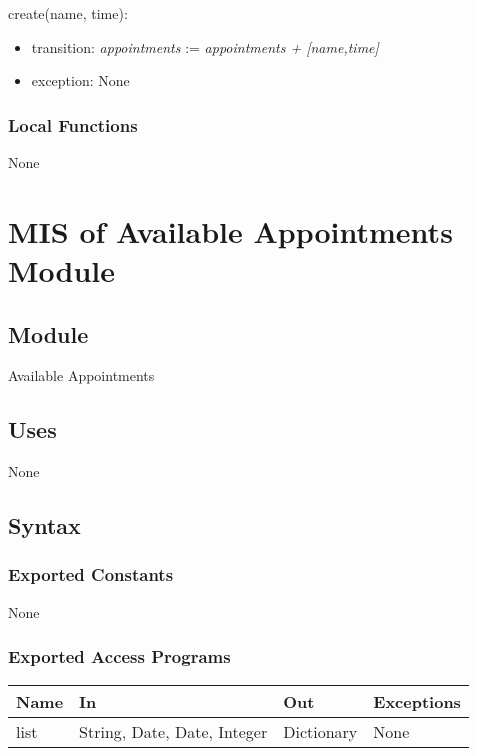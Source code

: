 \documentclass[12pt, titlepage]{article}
\begin{document}
\noindent create(name, time):
\begin{itemize}
\item transition: \textit{appointments} := \textit{appointments + [name,time]}
\item exception: None
\end{itemize}

\subsubsection{Local Functions}

None

\newpage

\section{MIS of Available Appointments Module} \label{mAvailableAppointments}

\subsection{Module}
Available Appointments

\subsection{Uses}
None

\subsection{Syntax}

\subsubsection{Exported Constants}
None
\subsubsection{Exported Access Programs}
\begin{center}
\begin{tabular}{p{2cm} p{4cm} p{4cm} p{2cm}}
\hline
\textbf{Name} & \textbf{In} & \textbf{Out} & \textbf{Exceptions} \\
\hline
list & String, Date, Date, Integer & Dictionary & None \\
\hline
\end{tabular}
\end{center}
\end{document}
